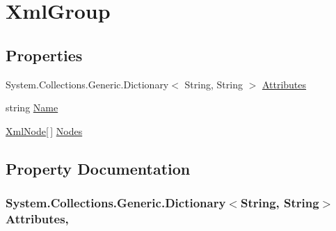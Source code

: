 \hypertarget{classOTA_1_1Permissions_1_1XmlGroup}{}\section{Xml\+Group}
\label{classOTA_1_1Permissions_1_1XmlGroup}
\subsection*{Properties}
\begin{DoxyCompactItemize}
\item 
System.\+Collections.\+Generic.\+Dictionary$<$ String, String $>$ \hyperlink{classOTA_1_1Permissions_1_1XmlGroup_a7d2f22a63a9fbbbe5c87cfc3cbbe39ba}{Attributes}
\item 
string \hyperlink{classOTA_1_1Permissions_1_1XmlGroup_a7ee9065718e6628dc7791b756fa6c0f9}{Name}
\item 
\hyperlink{classOTA_1_1Permissions_1_1XmlNode}{Xml\+Node}\mbox{[}$\,$\mbox{]} \hyperlink{classOTA_1_1Permissions_1_1XmlGroup_ab61d6546169a00b2514bab86c33e487d}{Nodes}
\end{DoxyCompactItemize}


\subsection{Property Documentation}
\hypertarget{classOTA_1_1Permissions_1_1XmlGroup_a7d2f22a63a9fbbbe5c87cfc3cbbe39ba}{}
\subsubsection[{Attributes}]{\setlength{\rightskip}{0pt plus 5cm}System.\+Collections.\+Generic.\+Dictionary$<$String, String$>$ Attributes\hspace{0.3cm}{\ttfamily [get]}, {\ttfamily [set]}}\label{classOTA_1_1Permissions_1_1XmlGroup_a7d2f22a63a9fbbbe5c87cfc3cbbe39ba}
\hypertarget{classOTA_1_1Permissions_1_1XmlGroup_a7ee9065718e6628dc7791b756fa6c0f9}{}
